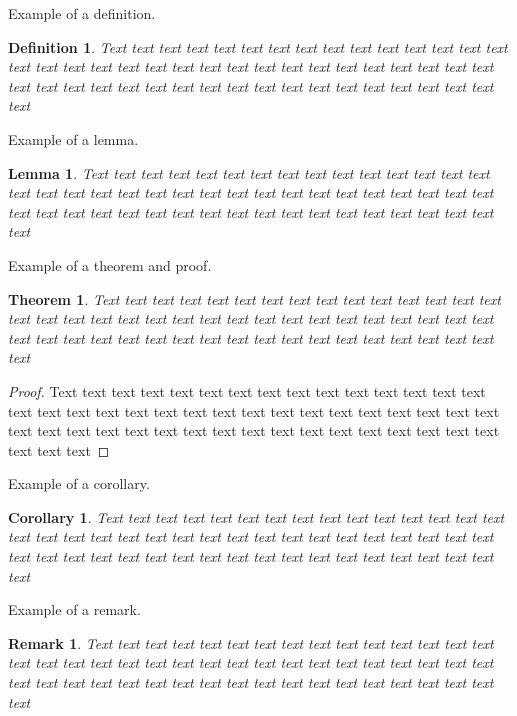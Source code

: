 \documentclass[12pt]{amsart}
\newtheorem{theorem}{Theorem}
\newtheorem{definition}{Definition}
\newtheorem{lemma}{Lemma}
\newtheorem{remark}{Remark}
\newtheorem{corollary}{Corollary}
\numberwithin{equation}{section}
\numberwithin{definition}{section}
\numberwithin{theorem}{section}
\numberwithin{lemma}{section}
\numberwithin{remark}{section}
\numberwithin{corollary}{section}
\numberwithin{proposition}{section}
\numberwithin{equation}{section}
\begin{document}
Example of a definition.

\begin{definition}\label{def-1}
Text text text text text text text text text text text text text text text text text text text text text text text text text text text text text text text text text text text text text text text text text text text text text text text text text text text text
\end{definition}


Example of a lemma.

\begin{lemma}\label{lem-1}
Text text text text text text text text text text text text text text text text text text text text text text text text text text text text text text text text text text text text text text text text text text text text text text text text text text text text
\end{lemma}



Example of a theorem and proof.

\begin{theorem}\label{th-1}
Text text text text text text text text text text text text text text text text text text text text text text text text text text text text text text text text text text text text text text text text text text text text text text text text text text text text
\end{theorem}

\begin{proof}
Text text text text text text text text text text text text text text text text text text text text text text text text text text text text text text text text text text text text text text text text text text text text text text text text text text text text
\end{proof}

Example of a corollary.

\begin{corollary}\label{cor-1}
Text text text text text text text text text text text text text text text text text text text text text text text text text text text text text text text text text text text text text text text text text text text text text text text text text text text text
\end{corollary}


Example of a remark.

\begin{remark}\label{rem-1}
Text text text text text text text text text text text text text text text text text text text text text text text text text text text text text text text text text text text text text text text text text text text text text text text text text text text text
\end{remark}
\end{document}
